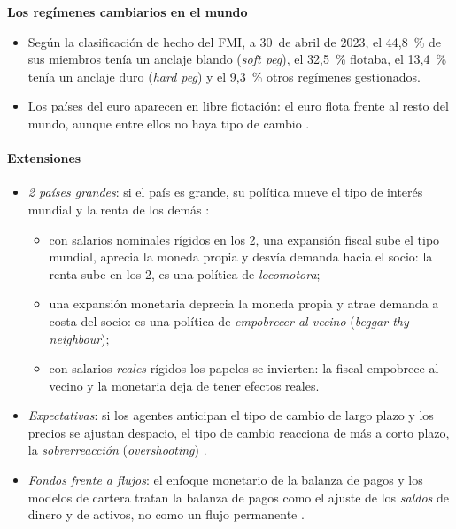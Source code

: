 \documentclass[11pt]{article}
\begin{document}
\begin{anotaciones}
\textbf{Los regímenes cambiarios en el mundo}
\begin{itemize}
\item Según la clasificación de hecho del FMI, a 30~de abril de 2023, el 44,8~\% de sus miembros tenía un anclaje blando (\emph{soft peg}), el 32,5~\% flotaba, el 13,4~\% tenía un anclaje duro (\emph{hard peg}) y el 9,3~\% otros regímenes gestionados\nocite{FMI2024AREAER2023}.
\item Los países del euro aparecen en libre flotación: el euro flota frente al resto del mundo, aunque entre ellos no haya tipo de cambio .
\end{itemize}
\end{anotaciones}

\paragraph{Extensiones}

\begin{itemize}
\item \emph{2 países grandes}: si el país es grande, su política mueve el tipo de interés mundial y la renta de los demás\nocite{Mundell1964Reply,Heijdra2017Foundations}  :
  \begin{itemize}
  \item con salarios nominales rígidos en los 2, una expansión fiscal sube el tipo mundial, aprecia la moneda propia y desvía demanda hacia el socio: la renta sube en los 2, es una política de \emph{locomotora};
  \item una expansión monetaria deprecia la moneda propia y atrae demanda a costa del socio: es una política de \emph{empobrecer al vecino} (\emph{beggar-thy-neighbour});
  \item con salarios \emph{reales} rígidos los papeles se invierten: la fiscal empobrece al vecino y la monetaria deja de tener efectos reales.
  \end{itemize}
\item \emph{Expectativas}: si los agentes anticipan el tipo de cambio de largo plazo y los precios se ajustan despacio, el tipo de cambio reacciona de más a corto plazo, la \emph{sobrerreacción} (\emph{overshooting})\nocite{Dornbusch1976Expectations} .
\item \emph{Fondos frente a flujos}: el enfoque monetario de la balanza de pagos\nocite{FrenkelJohnson1976Monetary} y los modelos de cartera tratan la balanza de pagos como el ajuste de los \emph{saldos} de dinero y de activos, no como un flujo permanente .
\end{itemize}
\end{document}
